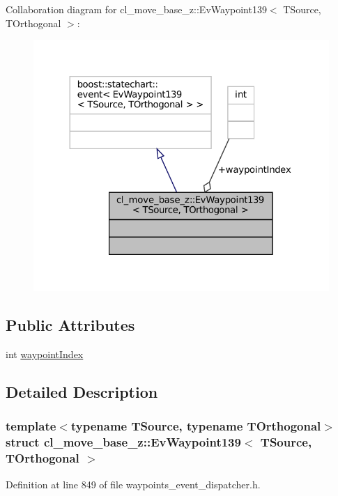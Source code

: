 Collaboration diagram for cl\+\_\+move\+\_\+base\+\_\+z\+:\+:Ev\+Waypoint139$<$ T\+Source, T\+Orthogonal $>$\+:
\nopagebreak
\begin{figure}[H]
\begin{center}
\leavevmode
\includegraphics[width=324pt]{structcl__move__base__z_1_1EvWaypoint139__coll__graph}
\end{center}
\end{figure}
\subsection*{Public Attributes}
\begin{DoxyCompactItemize}
\item 
int \hyperlink{structcl__move__base__z_1_1EvWaypoint139_a470e12ea8c3e7b77d0fe708d6678dcd3}{waypoint\+Index}
\end{DoxyCompactItemize}


\subsection{Detailed Description}
\subsubsection*{template$<$typename T\+Source, typename T\+Orthogonal$>$\newline
struct cl\+\_\+move\+\_\+base\+\_\+z\+::\+Ev\+Waypoint139$<$ T\+Source, T\+Orthogonal $>$}



Definition at line 849 of file waypoints\+\_\+event\+\_\+dispatcher.\+h.



